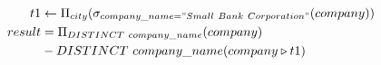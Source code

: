 \documentclass{dingjia}
\begin{document}
\begin{alignat*}
   t1 & \leftarrow \Pi_{city}(\sigma_{company\_name = "Small\ Bank\ Corporation"}(company))\\
  result & = \Pi_{DISTINCT\ company\_name}(company) \\
  & -{DISTINCT\ company\_name}(company \triangleright t1)
\end{alignat*}
\end{document}
